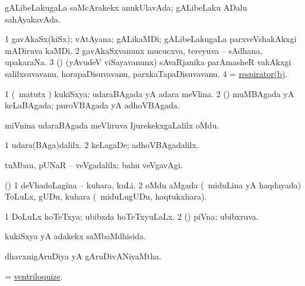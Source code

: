 \bentry
{} 
\gl{\gu}
\expl{}
\bmng
 gALibeLakugaLa saMcArakekx anukUlavAda; gALibeLaku ADalu sahAyakavAda. 
\emng
\eentry

\bentry
{} 
\gl{\nA}
\expl{}
\bmng
\bnum
\num{1} gavAkaSx(kiSx); vAtAyana; gALikaMDi; gALibeLakugaLa parxveVshakAkxgi mADiruva kaMDi. 
\num{2} gavAkaSxvanunx mucucxva, tereyuva -- sAdhana, upakaraNa. 
\num{3} (\rUpa) (yAvudeV viSayavanunx) sAvaRjanika parAmasheR \mo vakAkxgi salilxsuvavanu, horapaDisuvavanu, parxkaTapaDisuvavanu. 
\num{4} = \hyperref{kandict_r.pdf}{R}{respirator(b)1}{respirator(b)}. 
\enum
\emng
\eentry

\bentry
{} 
\gl{\gu}
\expl{}
\bmng
\bnum
\num{1} (\pArxvi\ matutx \aMrashA) kukiSxya; udaraBAgada yA adara meVlina. 
\num{2} (\savi) muMBAgada yA keLaBAgada; puroVBAgada yA adhoVBAgada. 
\enum
\emng
\eentry

\bentry
{}
\gl{\nA}
\expl{}
\bmng
 miVnina udaraBAgada meVliruva IjurekekxgaLalilx oMdu. 
\emng
\eentry

\bentry
{} 
\gl{\kirxvi}
\expl{}
\bmng
\bnum
\num{1} udara(BAga)dalilx. 
\num{2} keLagaDe; adhoVBAgadalilx. 
\enum
\emng
\eentry

\bentry
{} 
\gl{\kirxvi}
\expl{\F}
\bmng
 tuMbau, pUNaR -- veVgadalilx; bahu veVgavAgi. 
\emng
\eentry

\bentry
{} 
\gl{\nA}
\expl{}
\bmng
 (\aMrashA) 
\bnum
\num{1} deVhadoLagina -- kuhara, kuLi. 
\num{2} oMdu aMgada (\kanmu\ miduLina yA haqdayada) ToLuLx, gUDu, kuhara (\kanmu\ miduLugUDu, haqtukxhara). 
\enum
\emng
\eentry

\bentry
{} 
\gl{\gu}
\expl{}
\bmng
\bnum
\num{1} DoLuLx hoTeTxya; ubibxda hoTeTxyuLaLx. 
\num{2} (\savi) piVna; ubibxruva. 
\enum
\emng
\eentry

\bentry
{} 
\gl{\gu}
\expl{}
\bmng
 kukiSxya yA adakekx saMbaMdhisida. 
\emng
\eentry

\bentry
{} 
\gl{\gu}
\expl{}
\bmng
 dhavxnigAruDiya yA gAruDivANiyaMtha. 
\emng
\eentry

\bentry
{} 
\gl{\akirx}
\expl{}
\bmng
 = \hyperlink{ventriloquize}{ventriloquize}. 
\emng
\eentry

